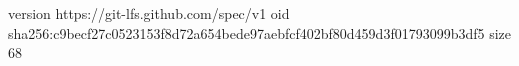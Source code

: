 version https://git-lfs.github.com/spec/v1
oid sha256:c9becf27c0523153f8d72a654bede97aebfcf402bf80d459d3f01793099b3df5
size 68
